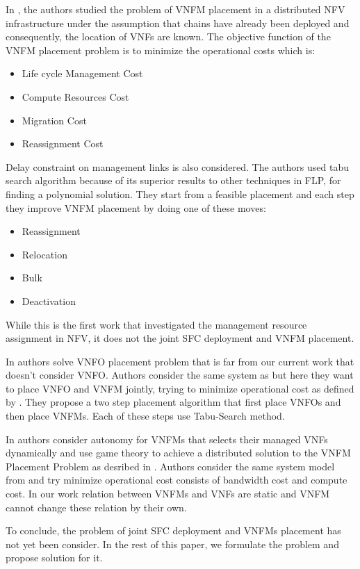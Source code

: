 In \cite{AbuLebdeh2017}, the authors studied the problem of VNFM placement in a distributed NFV infrastructure under the assumption that chains have already been deployed and consequently, the location of VNFs are known.
The objective function of the VNFM placement problem is to minimize the operational costs which is:
\begin{itemize}
    \item Life cycle Management Cost
    \item Compute Resources Cost
    \item Migration Cost
    \item Reassignment Cost
\end{itemize}
Delay constraint on management links is also considered.
The authors used tabu search algorithm because of its superior results to other techniques in FLP, for finding a polynomial solution. They start from a feasible placement and each step they improve VNFM placement by doing one of these moves:
\begin{itemize}
    \item Reassignment
    \item Relocation
    \item Bulk
    \item Deactivation
\end{itemize}
While this is the first work that investigated the management resource assignment in NFV, it does not the joint SFC deployment and VNFM placement.

In \cite{AbuLebdeh20172} authors solve VNFO placement problem that is far from our current work that doesn't consider VNFO.
Authors consider the same system as \cite{AbuLebdeh2017} but here they want to place VNFO and VNFM jointly, trying to minimize operational cost as defined by \cite{AbuLebdeh2017}.
They propose a two step placement algorithm that first place VNFOs and then place VNFMs. Each of these steps use Tabu-Search method.

In \cite{Chiang2019} authors consider autonomy for VNFMs that selects their managed VNFs dynamically and use game theory to achieve a distributed solution to the VNFM Placement Problem as desribed in \cite{AbuLebdeh2017}.
Authors consider the same system model from \cite{AbuLebdeh2017} and try minimize operational cost consists of bandwidth cost and compute cost.
In our work relation between VNFMs and VNFs are static and VNFM cannot change these relation by their own.

To conclude, the problem of joint SFC deployment and VNFMs placement has not yet been consider. In the rest of this paper, we formulate the problem and propose solution for it.

